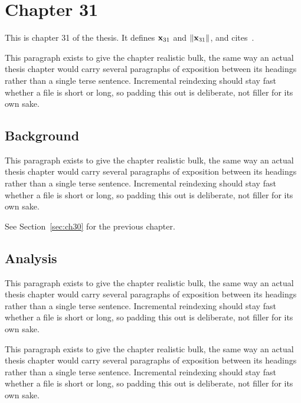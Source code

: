 \section{Chapter 31}
\label{sec:ch31}

This is chapter 31 of the thesis. It defines $\mathbf{x}_{31}$ and $\lVert \mathbf{x}_{31} \rVert$, and cites~\cite{ref1}.

This paragraph exists to give the chapter realistic bulk, the same way an actual thesis chapter would carry several paragraphs of exposition between its headings rather than a single terse sentence. Incremental reindexing should stay fast whether a file is short or long, so padding this out is deliberate, not filler for its own sake.

\subsection{Background}
\label{sec:ch31:background}

This paragraph exists to give the chapter realistic bulk, the same way an actual thesis chapter would carry several paragraphs of exposition between its headings rather than a single terse sentence. Incremental reindexing should stay fast whether a file is short or long, so padding this out is deliberate, not filler for its own sake.

See Section~\ref{sec:ch30} for the previous chapter.

\subsection{Analysis}
\label{sec:ch31:analysis}

This paragraph exists to give the chapter realistic bulk, the same way an actual thesis chapter would carry several paragraphs of exposition between its headings rather than a single terse sentence. Incremental reindexing should stay fast whether a file is short or long, so padding this out is deliberate, not filler for its own sake.

This paragraph exists to give the chapter realistic bulk, the same way an actual thesis chapter would carry several paragraphs of exposition between its headings rather than a single terse sentence. Incremental reindexing should stay fast whether a file is short or long, so padding this out is deliberate, not filler for its own sake.
